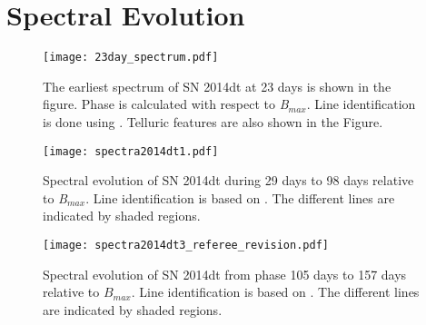 \documentclass[fleqn,usenatbib]{mnras}
\begin{document}

\section{Spectral Evolution}

\begin{figure}
	\begin{center}
		\texttt{[image: 23day\_spectrum.pdf]}
	\end{center}
	\caption{The earliest spectrum of SN 2014dt at 23 days is shown in the figure. Phase is calculated with respect to {\it B}$_{max}$. Line identification is done using \citet{2004PASP..116..903B}. Telluric features are also shown in the Figure.} 
	\label{fig:23day_spectrum}
\end{figure} 

\begin{figure*}
	\begin{center}
		\texttt{[image: spectra2014dt1.pdf]}
	\end{center}
	\caption{Spectral evolution of SN 2014dt during 29 days to 98 days relative to {\it B}$_{max}$. Line identification is based on \citealt{2004PASP..116..903B}. The different lines are indicated by shaded regions.}
	\label{fig:spectra_second_plot}
\end{figure*}

\begin{figure*} 
	\begin{center}
		\texttt{[image: spectra2014dt3\_referee\_revision.pdf]}
	\end{center}
	\caption{Spectral evolution of SN 2014dt from phase 105 days to 157 days relative to $B$$_{max}$. Line identification is based on \citet{2004PASP..116..903B}. The different lines are indicated by shaded regions.}
	\label{fig:spectra_2014dt3}
\end{figure*} 
\end{document}
